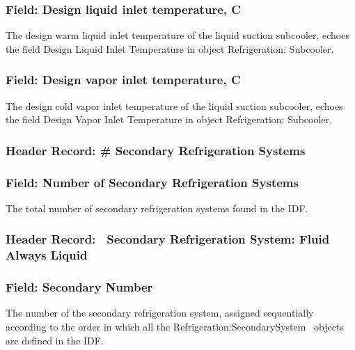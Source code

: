 \subsubsection{Field: Design liquid inlet temperature, C}\label{field-design-liquid-inlet-temperature-c}

The design warm liquid inlet temperature of the liquid suction subcooler, echoes the field Design Liquid Inlet Temperature in object Refrigeration: Subcooler.

\subsubsection{Field: Design vapor inlet temperature, C}\label{field-design-vapor-inlet-temperature-c}

The design cold vapor inlet temperature of the liquid suction subcooler, echoes the field Design Vapor Inlet Temperature in object Refrigeration: Subcooler.

\subsubsection{Header Record: \# Secondary Refrigeration Systems}\label{header-record-secondary-refrigeration-systems}

\subsubsection{Field: Number of Secondary Refrigeration Systems}\label{field-number-of-secondary-refrigeration-systems}

The total number of secondary refrigeration systems found in the IDF.

\subsubsection{Header Record:~ Secondary Refrigeration System: Fluid Always Liquid}\label{header-record-secondary-refrigeration-system-fluid-always-liquid}

\subsubsection{Field: Secondary Number}\label{field-secondary-number-1}

The number of the secondary refrigeration system, assigned sequentially according to the order in which all the Refrigeration:SecondarySystem~ objects are defined in the IDF.


